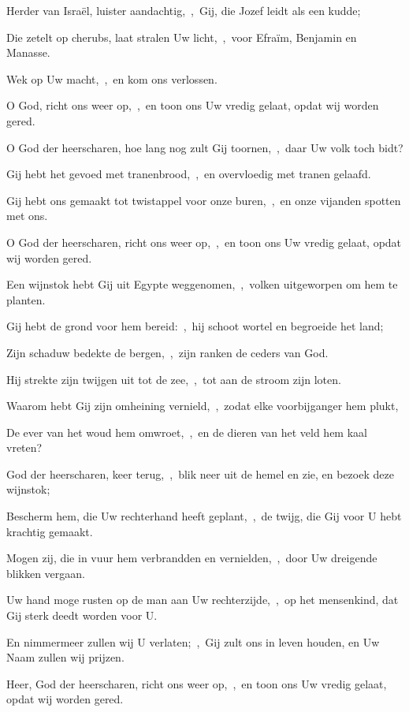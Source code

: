 \documentclass[12pt,twoside,a5paper]{article}
\begin{document}


\begin{halfparskip}
  Herder van Israël, luister aandachtig,~\sep\ Gij, die Jozef leidt als een kudde;


  Die zetelt op cherubs, laat stralen Uw licht,~\sep\ voor Efraïm, Benjamin en Manasse.

  Wek op Uw macht,~\sep\ en kom ons verlossen.

  O God, richt ons weer op,~\sep\ en toon ons Uw vredig gelaat, opdat wij worden gered.

  O God der heerscharen, hoe lang nog zult Gij toornen,~\sep\ daar Uw volk toch bidt?

  Gij hebt het gevoed met tranenbrood,~\sep\ en overvloedig met tranen gelaafd.

  Gij hebt ons gemaakt tot twistappel voor onze buren,~\sep\ en onze vijanden spotten met ons.

  O God der heerscharen, richt ons weer op,~\sep\ en toon ons Uw vredig gelaat, opdat wij worden gered.
\end{halfparskip}


\begin{halfparskip}
  Een wijnstok hebt Gij uit Egypte weggenomen,~\sep\ volken uitgeworpen om hem te planten.

  Gij hebt de grond voor hem bereid:~\sep\ hij schoot wortel en begroeide het land;

  Zijn schaduw bedekte de bergen,~\sep\ zijn ranken de ceders van God.

  Hij strekte zijn twijgen uit tot de zee,~\sep\ tot aan de stroom zijn loten.

  Waarom hebt Gij zijn omheining vernield,~\sep\ zodat elke voorbijganger hem plukt,

  De ever van het woud hem omwroet,~\sep\ en de dieren van het veld hem kaal vreten?

  God der heerscharen, keer terug,~\sep\ blik neer uit de hemel en zie, en bezoek deze wijnstok;

  Bescherm hem, die Uw rechterhand heeft geplant,~\sep\ de twijg, die Gij voor U hebt krachtig gemaakt.

  Mogen zij, die in vuur hem verbrandden en vernielden,~\sep\ door Uw dreigende blikken vergaan.

  Uw hand moge rusten op de man aan Uw rechterzijde,~\sep\ op het mensenkind, dat Gij sterk deedt worden voor U.

  En nimmermeer zullen wij U verlaten;~\sep\ Gij zult ons in leven houden, en Uw Naam zullen wij prijzen.

  Heer, God der heerscharen, richt ons weer op,~\sep\ en toon ons Uw vredig gelaat, opdat wij worden gered.
\end{halfparskip}
\end{document}
